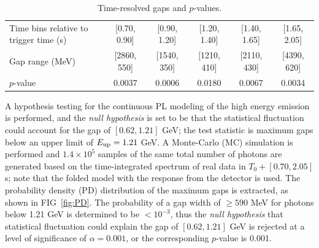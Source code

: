 \documentclass[prd,twocolumn,amsmath,amssymb,aps,linenumbers]{revtex4-2} %
\begin{document}
\begin{table} 
\centering
\caption{Time-resolved gaps and $p$-values.\label{tab:gapprob}}
\begin{ruledtabular}
\begin{tabular}{lccccc}
Time bins relative to trigger time (s)
&[0.70, 0.90]
&[0.90, 1.20]
&[1.20, 1.40]
&[1.40, 1.65]
&[1.65, 2.05]
\\
Gap range (MeV) 
&[2860, 550]
&[1540, 350]
&[1210, 410]
&[2110, 430]
&[4390, 620]
\\
 $p$-value &0.0037 &0.0006 &0.0180 &0.0067 &0.0034 \\
\end{tabular}
\end{ruledtabular}
\end{table}

A hypothesis testing for the continuous PL modeling of the high energy emission is performed, and the \textit{null hypothesis} is set to be that the statistical fluctuation could account for the gap of $[0.62,1.21]$ GeV; the test statistic is maximum gaps below an upper limit of $E_{\rm up}=1.21$ GeV.
A Monte-Carlo (MC) simulation is performed and $1.4\times10^5$ samples of the same total number of photons are generated based on the time-integrated spectrum of real data in $T_0+[0.70,2.05]$ s; note that the folded model with the response from the detector is used. The probability density (PD) distribution of the maximum gaps is extracted, as shown in FIG~\ref{fig:PD}. The probability of a gap width of $\geq590$ MeV for photons below 1.21 GeV is determined to be $<10^{-3}$, thus the \textit{ null hypothesis} that statistical fluctuation could explain the gap of $[0.62,1.21]$ GeV is rejected at a level of significance of $\alpha=0.001$, or the corresponding $p$-value is 0.001. 
\end{document}
